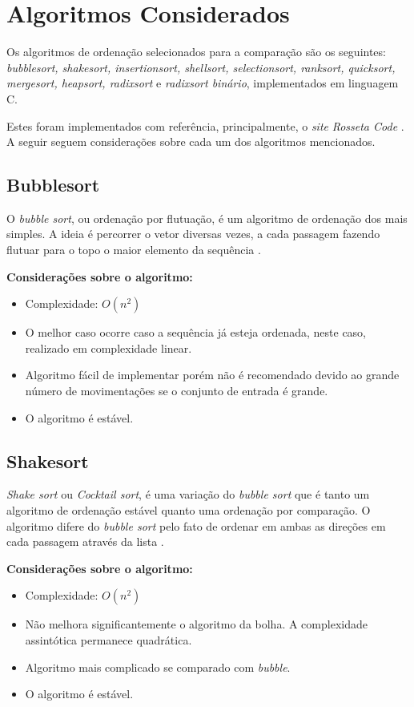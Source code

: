 \documentclass[
	11pt,
	oneside,
	a4paper,
	english,
	brazil,
	]{article}
\begin{document}
\section{Algoritmos Considerados}
Os algoritmos de ordenação selecionados para a comparação são os
seguintes: \textit{bubblesort, shakesort, insertionsort, shellsort, 
selectionsort, ranksort, quicksort, mergesort, heapsort, radixsort} e 
\textit{radixsort binário}, implementados em linguagem C.

Estes foram implementados com referência, principalmente, o \textit{site} 
\textit{Rosseta Code} \cite{rosetta}. A seguir seguem considerações sobre
cada um dos algoritmos mencionados.

\subsection{Bubblesort}
O \textit{bubble sort}, ou ordenação por flutuação, é um algoritmo
de ordenação dos mais simples. A ideia é percorrer o vetor diversas
vezes, a cada passagem fazendo flutuar para o topo o maior elemento
da sequência \cite{bubble}.

\noindent \textbf{Considerações sobre o algoritmo:}
\begin{itemize}
 \item Complexidade: $ O(n^2) $
 \item O melhor caso ocorre caso a sequência já esteja ordenada,
 neste caso, realizado em complexidade linear.
 \item Algoritmo fácil de implementar porém não é recomendado devido ao
 grande número de movimentações se o conjunto de entrada é grande.
 \item O algoritmo é estável.
\end{itemize}

\subsection{Shakesort}
\textit{Shake sort} ou \textit{Cocktail sort}, é uma variação do
\textit{bubble sort} que é tanto um algoritmo de ordenação estável
quanto uma ordenação por comparação. O algoritmo difere do
\textit{bubble sort} pelo fato de ordenar em ambas as direções
em cada passagem através da lista \cite{shake}.

\noindent \textbf{Considerações sobre o algoritmo:}
\begin{itemize}
 \item Complexidade: $ O(n^2) $
 \item Não melhora significantemente o algoritmo da bolha. A
 complexidade assintótica permanece quadrática.
 \item Algoritmo mais complicado se comparado com \textit{bubble}.
 \item O algoritmo é estável.
\end{itemize}
\end{document}
